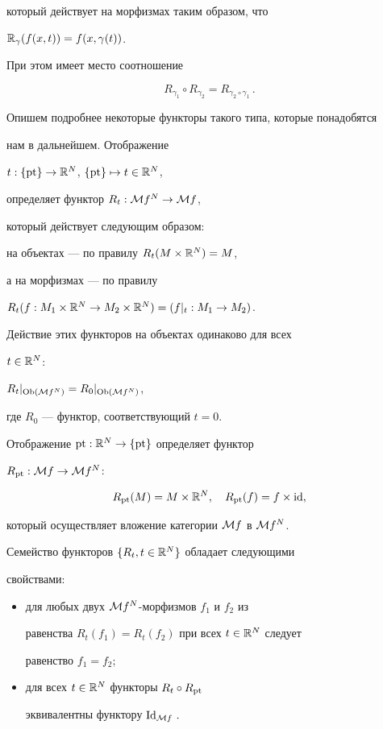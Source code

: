 который действует на морфизмах таким образом, что


${\Bbb R}_\gamma(f(x,t))=f(x,\gamma(t))$.


При этом имеет место соотношение


\begin{equation}\label{R_gamma}


R_{\gamma_1}\circ R_{\gamma_2}=R_{\gamma_2\circ\gamma_1}\,.


\end{equation}





Опишем подробнее некоторые функторы такого типа, которые понадобятся


нам в дальнейшем. Отображение


$t:\{\operatorname{pt}\}\rightarrow{\Bbb R}^N$, $\{\operatorname{pt}\}\mapsto t\in{\Bbb R}^N$,


определяет функтор $R_t:{\cal M} f^N\rightarrow{\cal M} f$,


который действует следующим образом:


на объектах --- по правилу $R_t(M\times{\Bbb R}^N)=M$,


а на морфизмах --- по правилу


$R_t(f:M_1\times{\Bbb R}^N\rightarrow M_2\times{\Bbb R}^N)=(f|_t:M_1\rightarrow M_2)$.


Действие этих функторов на объектах одинаково для всех


$t\in{\Bbb R}^N$:


$R_t|_{\operatorname{Ob}({\cal M} f^N)}=R_0|_{\operatorname{Ob}({\cal M} f^N)}$,


где $R_0$ --- функтор, соответствующий $t=0$.





Отображение $\operatorname{pt}:{\Bbb R}^N\rightarrow\{\operatorname{pt}\}$ определяет функтор


$R_{\operatorname{pt}}:{\cal M} f\rightarrow{\cal M} f^N$:


$$


R_{\pt}(M)=M\times\R^N,\quad R_{\pt}(f)=f\times\id,


$$


который осуществляет вложение категории ${\cal M} f$ в ${\cal M} f^N$.





Семейство функторов $\{R_t,t\in{\Bbb R}^N\}$ обладает следующими


свойствами:


\begin{itemize}


\item[(i)]  для любых двух ${\cal M} f^N$-морфизмов $f_1$ и $f_2$ из


равенства $R_t(f_1)=R_t(f_2)$ при всех $t\in{\Bbb R}^N$ следует


равенство $f_1=f_2$;


\item[(ii)]  для всех $t\in{\Bbb R}^N$ функторы $R_t\circ R_{\operatorname{pt}}$


эквивалентны функтору $\operatorname{Id}_{{\cal M} f}\,.$


\end{itemize}


